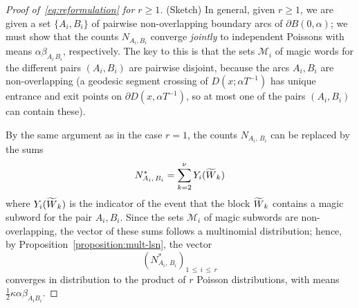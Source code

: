 \documentclass[AHL, Unicode, longabstracts, published]{cedram}
\let\oldtilde\tilde
\renewcommand*{\tilde}[1]{\mathchoice{\widetilde{#1}}{\widetilde{#1}}{\oldtilde{#1}}{\oldtilde{#1}}}\let\oldforall\forall
\renewcommand*{\forall}{\mathrel{\oldforall}}
\begin{document}
\begin{proof}[Proof of~\eqref{eq:reformulation} for $r\geq 1$]
(Sketch) In general, given $r \geq 1$, we are given a set $\{A_{i},B_{i}\}$ of pairwise non-overlapping boundary arcs of $\partial B (0,\alpha)$; we must show that the counts $N_{A_{i},B_{i}}$ converge \emph{jointly} to independent Poissons with means $\alpha \beta_{A_{i}\,B_{i}}$, respectively. The key to this is that the sets $\mathcal{M}_{i}$ of magic words for the different pairs $(A_{i},B_{i})$ are pairwise disjoint, because the arcs $A_{i},B_{i}$ are non-overlapping (a geodesic segment crossing of $D (x;\alpha T^{-1})$ has unique entrance and exit points on $\partial D (x,\alpha T^{-1})$, so at most one of the pairs $(A_{i},B_{i})$ can contain these).


By the same argument as in the case $r=1$, the counts $N_{A_{i},\,B_{i}}$ can be replaced by the sums
\[
N^{*}_{A_{i},\,B_{i}}=\sum_{k=2}^{\nu} Y_{i} (\tilde{W}_{k})
\]
where $Y_{i}(\tilde{W}_{k})$ is the indicator of the event that the block $\tilde{W}_{k}$ contains a magic subword for the pair $A_{i},B_{i}$. Since the sets $\mathcal{M}_{i}$ of magic subwords are non-overlapping, the vector of these sums follows a multinomial distribution; hence, by Proposition~\ref{proposition:mult-lsn}, the vector
\[
(N^{*}_{A_{i},\,B_{i}})_{1\,\leq\,i\,\leq\,r}
\]
converges in distribution to the product of $r$ Poisson distributions, with means $\frac{1}{2} \kappa\alpha \beta_{A_{i}B_{i}}$.
\end{proof}
\end{document}
